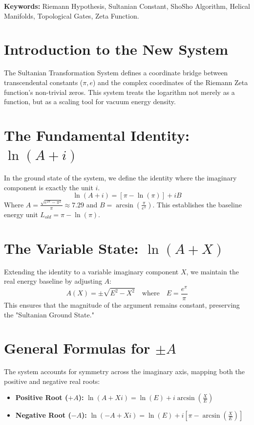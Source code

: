 \documentclass[11pt,a4paper]{article}
\begin{document}
\textbf{Keywords:} Riemann Hypothesis, Sultanian Constant, ShoSho Algorithm, Helical Manifolds, Topological Gates, Zeta Function.

\section{Introduction to the New System}
The Sultanian Transformation System defines a coordinate bridge between transcendental constants ($\pi, e$) and the complex coordinates of the Riemann Zeta function's non-trivial zeros. This system treats the logarithm not merely as a function, but as a scaling tool for vacuum energy density.

\section{The Fundamental Identity: $\ln(A + i)$}
In the ground state of the system, we define the identity where the imaginary component is exactly the unit $i$.
\begin{equation}
    \ln(A + i) = [\pi - \ln(\pi)] + i B
\end{equation}
Where $A = \frac{\sqrt{e^{2\pi} - \pi^2}}{\pi} \approx 7.29$ and $B = \arcsin\left(\frac{\pi}{e^\pi}\right)$. This establishes the baseline energy unit $L_{old} = \pi - \ln(\pi)$.

\section{The Variable State: $\ln(A + X)$}
Extending the identity to a variable imaginary component $X$, we maintain the real energy baseline by adjusting $A$:
\begin{equation}
    A(X) = \pm \sqrt{E^2 - X^2} \quad \text{where} \quad E = \frac{e^\pi}{\pi}
\end{equation}
This ensures that the magnitude of the argument remains constant, preserving the "Sultanian Ground State."

\section{General Formulas for $\pm A$}
The system accounts for symmetry across the imaginary axis, mapping both the positive and negative real roots:
\begin{itemize}
    \item \textbf{Positive Root ($+A$):} $\ln(A + Xi) = \ln(E) + i \arcsin\left(\frac{X}{E}\right)$
    \item \textbf{Negative Root ($-A$):} $\ln(-A + Xi) = \ln(E) + i \left[ \pi - \arcsin\left(\frac{X}{E}\right) \right]$
\end{itemize}
\end{document}
